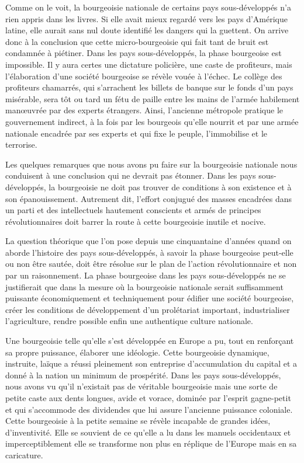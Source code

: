 \documentclass[french,twoside]{book} %
\begin{document}
Comme on le voit, la bourgeoisie nationale de certains pays sous-développés n’a rien appris dans les livres. Si elle avait mieux regardé vers les pays d’Amérique latine, elle aurait sans nul doute identifié les dangers qui la guettent. On arrive donc à la conclusion que cette micro-bourgeoisie qui fait tant de bruit est condamnée à piétiner. Dans les pays sous-développés, la phase bourgeoise est impossible. Il y aura certes une dictature policière, une caste de profiteurs, mais l’élaboration d’une société bourgeoise se révèle vouée à l’échec. Le collège des profiteurs chamarrés, qui s’arrachent les billets de banque sur le fonds d’un pays misérable, sera tôt ou tard un fétu de paille entre les mains de l’armée habilement manœuvrée par des experts étrangers. Ainsi, l’ancienne métropole pratique le gouvernement indirect, à la fois par les bourgeois qu’elle nourrit et par une armée nationale encadrée par ses experts et qui fixe le peuple, l’immobilise et le terrorise.\par
\bigbreak
\noindent Les quelques remarques que nous avons pu faire sur la bourgeoisie nationale nous conduisent à une conclusion qui ne devrait pas étonner. Dans les pays sous-développés, la   bourgeoisie ne doit pas trouver de conditions à son existence et à son épanouissement. Autrement dit, l’effort conjugué des masses encadrées dans un parti et des intellectuels hautement conscients et armés de principes révolutionnaires doit barrer la route à cette bourgeoisie inutile et nocive.\par
\bigbreak
\noindent La question théorique que l’on pose depuis une cinquantaine d’années quand on aborde l’histoire des pays sous-développés, à savoir la phase bourgeoise peut-elle ou non être sautée, doit être résolue sur le plan de l’action révolutionnaire et non par un raisonnement. La phase bourgeoise dans les pays sous-développés ne se justifierait que dans la mesure où la bourgeoisie nationale serait suffisamment puissante économiquement et techniquement pour édifier une société bourgeoise, créer les conditions de développement d’un prolétariat important, industrialiser l’agriculture, rendre possible enfin une authentique culture nationale.\par
\bigbreak
\noindent Une bourgeoisie telle qu’elle s’est développée en Europe a pu, tout en renforçant sa propre puissance, élaborer une idéologie. Cette bourgeoisie dynamique, instruite, laïque a réussi pleinement son entreprise d’accumulation du capital et a donné à la nation un minimum de prospérité. Dans les pays sous-développés, nous avons vu qu’il n’existait pas de véritable bourgeoisie mais une sorte de petite caste aux dents longues, avide et vorace, dominée par l’esprit gagne-petit et qui s’accommode des dividendes que lui assure l’ancienne puissance coloniale. Cette bourgeoisie à la petite semaine se révèle incapable de grandes idées, d’inventivité. Elle se souvient de ce qu’elle a lu dans les manuels occidentaux et imperceptiblement elle se transforme non plus en réplique de l’Europe mais en sa caricature.\par
\end{document}

